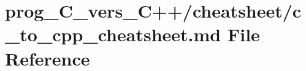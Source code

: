 \hypertarget{prog__C__vers__C_09_09_2cheatsheet_2c__to__cpp__cheatsheet_8md}{}\section{prog\+\_\+\+C\+\_\+vers\+\_\+\+C++/cheatsheet/c\+\_\+to\+\_\+cpp\+\_\+cheatsheet.md File Reference}
\label{prog__C__vers__C_09_09_2cheatsheet_2c__to__cpp__cheatsheet_8md}
